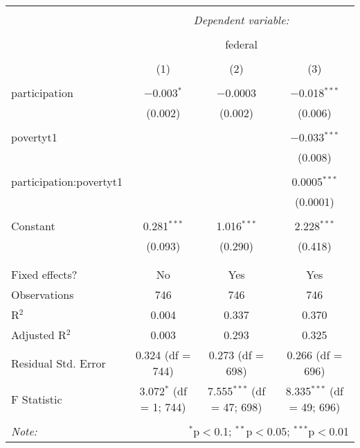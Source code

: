 \documentclass[
]{article}
\begin{document}
\begin{table}[!htbp] \centering 
  \caption{} 
  \label{} 
\begin{tabular}{@{\extracolsep{5pt}}lccc} 
\\[-1.8ex]\hline 
\hline \\[-1.8ex] 
 & \multicolumn{3}{c}{\textit{Dependent variable:}} \\ 
\cline{2-4} 
\\[-1.8ex] & \multicolumn{3}{c}{federal} \\ 
\\[-1.8ex] & (1) & (2) & (3)\\ 
\hline \\[-1.8ex] 
 participation & $-$0.003$^{*}$ & $-$0.0003 & $-$0.018$^{***}$ \\ 
  & (0.002) & (0.002) & (0.006) \\ 
  & & & \\ 
 povertyt1 &  &  & $-$0.033$^{***}$ \\ 
  &  &  & (0.008) \\ 
  & & & \\ 
 participation:povertyt1 &  &  & 0.0005$^{***}$ \\ 
  &  &  & (0.0001) \\ 
  & & & \\ 
 Constant & 0.281$^{***}$ & 1.016$^{***}$ & 2.228$^{***}$ \\ 
  & (0.093) & (0.290) & (0.418) \\ 
  & & & \\ 
\hline \\[-1.8ex] 
Fixed effects? & No & Yes & Yes \\ 
Observations & 746 & 746 & 746 \\ 
R$^{2}$ & 0.004 & 0.337 & 0.370 \\ 
Adjusted R$^{2}$ & 0.003 & 0.293 & 0.325 \\ 
Residual Std. Error & 0.324 (df = 744) & 0.273 (df = 698) & 0.266 (df = 696) \\ 
F Statistic & 3.072$^{*}$ (df = 1; 744) & 7.555$^{***}$ (df = 47; 698) & 8.335$^{***}$ (df = 49; 696) \\ 
\hline 
\hline \\[-1.8ex] 
\textit{Note:}  & \multicolumn{3}{r}{$^{*}$p$<$0.1; $^{**}$p$<$0.05; $^{***}$p$<$0.01} \\ 
\end{tabular} 
\end{table}
\end{document}
